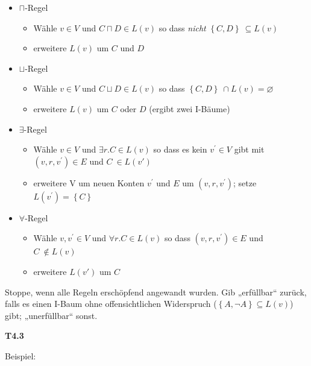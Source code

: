 \begin{itemize}
\item
  $\sqcap$-Regel

  \begin{itemize}
  \item
    Wähle $v \in V$ und $C \sqcap D \in L\left( v \right)$ so dass
    \emph{nicht} $\left\{ C,D \right\}\  \subseteq L\left( v \right)$
  \item
    erweitere $L(v)$ um $C$ und $D$
  \end{itemize}
\item
  $\sqcup$-Regel

  \begin{itemize}
  \item
    Wähle $v \in V$ und $C \sqcup D \in L\left( v \right)$ so dass
    $\left\{ C,D \right\}\  \cap L\left( v \right) = \varnothing$
  \item
    erweitere $L(v)$ um $C$ oder $D$ (ergibt zwei I-Bäume)
  \end{itemize}
\item
  $\exists$-Regel

  \begin{itemize}
  \item
    Wähle $v \in V$ und $\exists r.C \in L\left( v \right)$ so dass
    es kein $v^{'} \in V$ gibt mit $\left( v,r,v^{'} \right) \in E$
    und $C\  \in L\left( v' \right)$
  \item
    erweitere V um neuen Konten $v^{'}$ und $E$ um
    $\left( v,r,v^{'} \right)$; setze
    $L\left( v^{'} \right) = \left\{ C \right\}$
  \end{itemize}
\item
  $\forall$-Regel

  \begin{itemize}
  \item
    Wähle $v,v^{'} \in V$ und $\forall r.C \in L\left( v \right)$ so
    dass $\left( v,r,v^{'} \right) \in E$ und
    $C\  \notin L\left( v \right)$
  \item
    erweitere $L(v')$ um $C$
  \end{itemize}
\end{itemize}

Stoppe, wenn alle Regeln erschöpfend angewandt wurden. Gib „erfüllbar``
zurück, falls es einen I-Baum ohne offensichtlichen Widerspruch
($\left\{ A,\neg A \right\} \subseteq L\left( v \right)$) gibt;
„unerfüllbar`` sonst.

\textbf{T4.3}

Beispiel:

